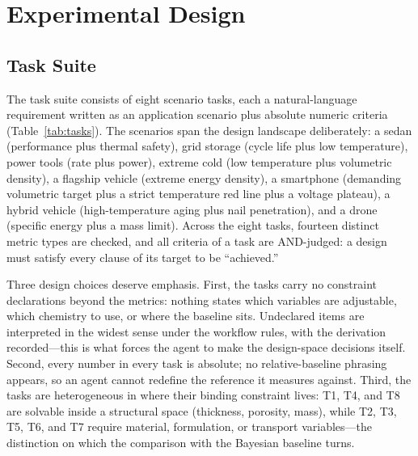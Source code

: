 \section{Experimental Design}
\label{sec:experiments}

\subsection{Task Suite}

The task suite consists of eight scenario tasks, each a natural-language
requirement written as an application scenario plus absolute numeric
criteria (Table~\ref{tab:tasks}). The scenarios span the design landscape
deliberately: a sedan (performance plus thermal safety), grid storage
(cycle life plus low temperature), power tools (rate plus power), extreme
cold (low temperature plus volumetric density), a flagship vehicle (extreme
energy density), a smartphone (demanding volumetric target plus a strict temperature
red line plus a voltage plateau), a hybrid vehicle (high-temperature aging
plus nail penetration), and a drone (specific energy plus a mass limit).
Across the eight tasks, fourteen distinct metric types are checked, and
all criteria of a task are AND-judged: a design must satisfy every clause
of its target to be ``achieved.''

Three design choices deserve emphasis. First, the tasks carry no constraint
declarations beyond the metrics: nothing states which variables are adjustable,
which chemistry to use, or where the baseline sits. Undeclared items are
interpreted in the widest sense under the workflow rules, with the derivation
recorded---this is what forces the agent to make the design-space decisions
itself. Second, every number in every task is absolute; no relative-baseline
phrasing appears, so an agent cannot redefine the reference it measures
against. Third, the tasks are heterogeneous in where their binding
constraint lives: T1, T4, and T8 are solvable inside a structural space
(thickness, porosity, mass), while T2, T3, T5, T6, and T7 require material,
formulation, or transport variables---the distinction on which the comparison
with the Bayesian baseline turns.

